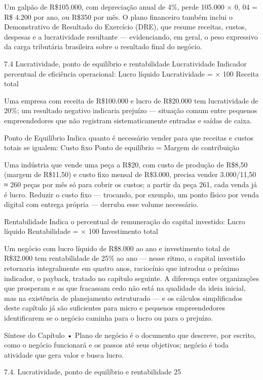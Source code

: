 Um galpão de R\$105.000, com depreciação anual de 4\%, perde 105.000 × 0, 04 = R\$ 4.200 por ano, ou R\$350 por mês. O plano financeiro também inclui o Demonstrativo de Resultado do Exercício (DRE), que resume receitas, custos, despesas e a lucratividade resultante — evidenciando, em geral, o peso expressivo da carga tributária brasileira sobre o resultado final do negócio.

7.4 Lucratividade, ponto de equilíbrio e rentabilidade Lucratividade Indicador percentual de eficiência operacional: Lucro líquido Lucratividade = × 100 Receita total

Uma empresa com receita de R\$100.000 e lucro de R\$20.000 tem lucratividade de 20\%; um resultado negativo indicaria prejuízo — situação comum entre pequenos empreendedores que não registram sistematicamente entradas e saídas de caixa.

Ponto de Equilíbrio Indica quanto é necessário vender para que receitas e custos totais se igualem: Custo fixo Ponto de equilíbrio = Margem de contribuição

Uma indústria que vende uma peça a R\$20, com custo de produção de R\$8,50 (margem de R\$11,50) e custo fixo mensal de R\$3.000, precisa vender 3.000/11,50 ≈ 260 peças por mês só para cobrir os custos; a partir da peça 261, cada venda já é lucro. Reduzir o custo fixo — trocando, por exemplo, um ponto físico por venda digital com entrega própria — derruba esse volume necessário.

Rentabilidade Indica o percentual de remuneração do capital investido: Lucro líquido Rentabilidade = × 100 Investimento total

Um negócio com lucro líquido de R\$8.000 ao ano e investimento total de R\$32.000 tem rentabilidade de 25\% ao ano — nesse ritmo, o capital investido retornaria integralmente em quatro anos, raciocínio que introduz o próximo indicador, o payback, tratado no capítulo seguinte. A diferença entre organizações que prosperam e as que fracassam cedo não está na qualidade da ideia inicial, mas na existência de planejamento estruturado — e os cálculos simplificados deste capítulo já são suficientes para micro e pequenos empreendedores identificarem se o negócio caminha para o lucro ou para o prejuízo.

Síntese do Capítulo • Plano de negócio é o documento que descreve, por escrito, como o negócio funcionará e os passos até seus objetivos; negócio é toda atividade que gera valor e busca lucro.

7.4. Lucratividade, ponto de equilíbrio e rentabilidade 25

